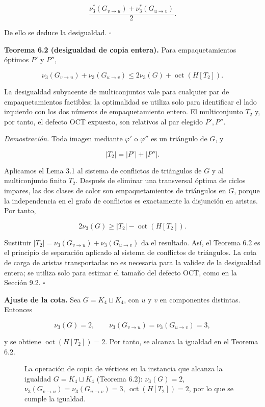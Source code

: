 \documentclass[spanish,11pt,a4paper]{article}
\begin{document}
\[
\frac{\nu_3^*(G_{v\to u})+\nu_3^*(G_{u\to v})}{2}.
\]

De ello se deduce la desigualdad. \(\square\)

\textbf{Teorema 6.2 (desigualdad de copia entera).} Para
empaquetamientos óptimos \(P'\) y \(P''\),

\[
\nu_3(G_{v\to u})+\nu_3(G_{u\to v})
\le
2\nu_3(G)+\operatorname{oct}(H[T_2]).
\]

La desigualdad subyacente de multiconjuntos vale para cualquier par de
empaquetamientos factibles; la optimalidad se utiliza solo para
identificar el lado izquierdo con los dos números de empaquetamiento
entero. El multiconjunto \(T_2\) y, por tanto, el defecto OCT expuesto,
son relativos al par elegido \(P',P''\).

\emph{Demostración.} Toda imagen mediante \(\varphi'\) o \(\varphi''\)
es un triángulo de \(G\), y

\[
|T_2|=|P'|+|P''|.
\]

Aplicamos el Lema 3.1 al sistema de conflictos de triángulos de \(G\) y
al multiconjunto finito \(T_2\). Después de eliminar una transversal
óptima de ciclos impares, las dos clases de color son empaquetamientos
de triángulos en \(G\), porque la independencia en el grafo de
conflictos es exactamente la disjunción en aristas. Por tanto,

\[
2\nu_3(G)
\ge
|T_2|-\operatorname{oct}(H[T_2]).
\]

Sustituir \(|T_2|=\nu_3(G_{v\to u})+\nu_3(G_{u\to v})\) da el resultado.
Así, el Teorema 6.2 es el principio de separación aplicado al sistema de
conflictos de triángulos. La cota de carga de aristas transportadas no
es necesaria para la validez de la desigualdad entera; se utiliza solo
para estimar el tamaño del defecto OCT, como en la Sección 9.2.
\(\square\)

\textbf{Ajuste de la cota.} Sea \(G=K_4\sqcup K_4\), con \(u\) y \(v\)
en componentes distintas. Entonces

\[
\nu_3(G)=2,
\qquad
\nu_3(G_{v\to u})=\nu_3(G_{u\to v})=3,
\]

y se obtiene \(\operatorname{oct}(H[T_2])=2\). Por tanto, se alcanza la
igualdad en el Teorema 6.2.

\begin{figure}[H]
\centering

\caption{La operación de copia de vértices en la instancia que alcanza la igualdad \(G=K_4\sqcup K_4\) (Teorema 6.2): \(\nu_3(G)=2\), \(\nu_3(G_{v\to u})=\nu_3(G_{u\to v})=3\), \(\operatorname{oct}(H[T_2])=2\), por lo que se cumple la igualdad.}
\label{fig:paper-v-2}
\end{figure}
\end{document}
